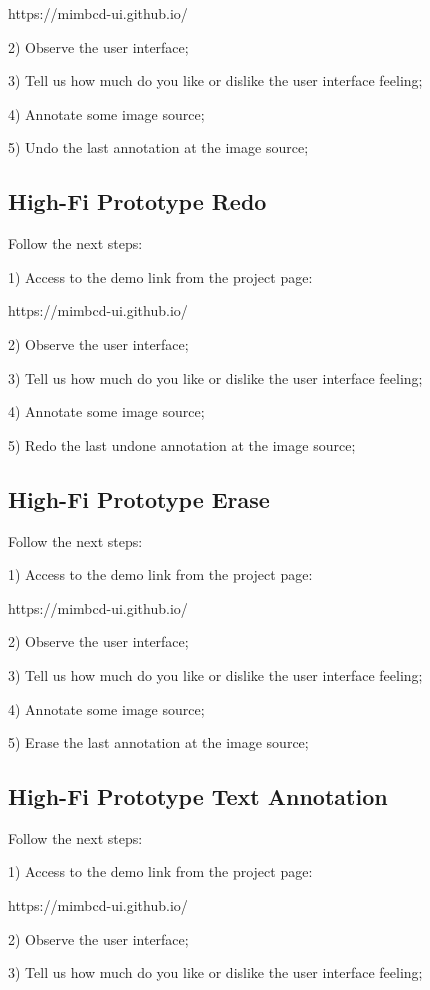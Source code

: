 https://mimbcd-ui.github.io/

2) Observe the user interface;

3) Tell us how much do you like or dislike the user interface feeling;

4) Annotate some image source;

5) Undo the last annotation at the image source;

\subsection{High-Fi Prototype Redo}

Follow the next steps:

1) Access to the demo link from the project page:

https://mimbcd-ui.github.io/

2) Observe the user interface;

3) Tell us how much do you like or dislike the user interface feeling;

4) Annotate some image source;

5) Redo the last undone annotation at the image source;

\subsection{High-Fi Prototype Erase}

Follow the next steps:

1) Access to the demo link from the project page:

https://mimbcd-ui.github.io/

2) Observe the user interface;

3) Tell us how much do you like or dislike the user interface feeling;

4) Annotate some image source;

5) Erase the last annotation at the image source;

\subsection{High-Fi Prototype Text Annotation}

Follow the next steps:

1) Access to the demo link from the project page:

https://mimbcd-ui.github.io/

2) Observe the user interface;

3) Tell us how much do you like or dislike the user interface feeling;

